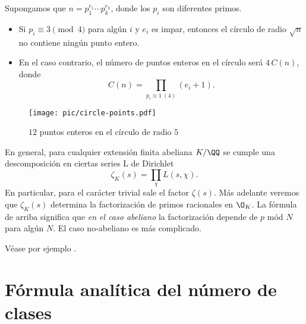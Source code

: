 \begin{teorema}
  Supongamos que $n = p_1^{e_1}\cdots p_k^{e_k}$, donde los $p_i$ son diferentes
  primos.
  \begin{itemize}
  \item Si $p_i \equiv 3 \pmod{4}$ para algún $i$ y $e_i$ es impar, entonces
    el círculo de radio $\sqrt{n}$ no contiene ningún punto entero.

  \item En el caso contrario, el número de puntos enteros en el círculo será
    $4\,C (n)$, donde
    $$C (n) = \prod_{p_i \equiv 1~(4)} (e_i + 1).$$
  \end{itemize}
\end{teorema}

\begin{figure}
  \begin{center}
    \texttt{[image: pic/circle-points.pdf]}
  \end{center}

  \caption{$12$ puntos enteros en el círculo de radio $5$}
\end{figure}

\begin{comentario}
  En general, para cualquier extensión finita abeliana $K/\QQ$ se cumple
  una descomposición en ciertas series L de Dirichlet
  $$\zeta_K (s) = \prod_\chi L (s,\chi).$$
  En particular, para el carácter trivial sale el factor $\zeta (s)$.
  Más adelante veremos que $\zeta_K (s)$ determina la factorización de primos
  racionales en $\O_K$. La fórmula de arriba significa que
  \emph{en el caso abeliano} la factorización depende de $p$ mód $N$ para algún
  $N$. El caso no-abeliano es más complicado.

  Véase por ejemplo \cite[Chapter~4]{Washington-GTM83}.
\end{comentario}


\section{Fórmula analítica del número de clases}

